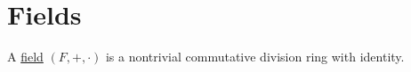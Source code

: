 \section{Fields}\label{sec:fields}

\begin{definition}\label{def:field}
  A \uline{field} $(F, +, \cdot)$ is a nontrivial commutative division ring with identity.
\end{definition}
